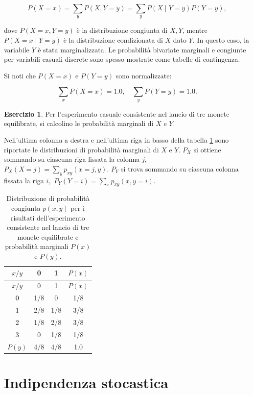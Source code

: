 \documentclass[
  11pt,
]{krantz}
\theoremstyle{definition}
\theoremstyle{definition}
\theoremstyle{definition}
\newtheorem{exercise}{Esercizio}[chapter]
\theoremstyle{definition}
\theoremstyle{remark}
\begin{document}
\begin{equation}
P(X = x) = \sum_y P(X, Y = y) = \sum_y P(X \mid Y = y) P(Y = y),
\end{equation}

dove \(P(X = x,Y = y)\) è la distribuzione congiunta di \(X, Y\), mentre \(P(X = x \mid Y = y)\) è la distribuzione condizionata di \(X\) dato \(Y\). In questo caso, la variabile \(Y\) è stata marginalizzata. Le probabilità bivariate marginali e congiunte per variabili casuali discrete sono spesso mostrate come tabelle di contingenza.

Si noti che \(P(X = x)\) e \(P(Y = y)\) sono normalizzate:

\[
\sum_x P(X=x) = 1.0, \quad \sum_y P(Y=y) = 1.0.
\]

\begin{exercise}

Per l'esperimento casuale consistente nel lancio di tre monete equilibrate, si calcolino le probabilità marginali di \(X\) e \(Y\).

Nell'ultima colonna a destra e nell'ultima riga in basso della tabella \ref{tab:ditr-cong-biv} sono riportate le distribuzioni di probabilità marginali di \(X\) e \(Y\). \(P_X\) si ottiene sommando su ciascuna riga fissata la colonna \(j\), \(P_X(X = j) = \sum_y p_{xy}(x = j, y)\). \(P_Y\) si trova sommando su ciascuna colonna fissata la riga \(i,\) \(P_Y (Y = i) = \sum_x p_{xy}(x, y = i)\).

\begin{longtable}[]{@{}cccc@{}}
\caption{\label{tab:ditr-cong-biv} Distribuzione di probabilità congiunta \(p(x,y)\) per i risultati dell'esperimento consistente nel lancio di tre monete equilibrate e probabilità marginali \(P(x)\) e \(P(y)\).}\tabularnewline
\toprule
\(x / y\) & 0 & 1 & \(P(x)\) \\
\midrule
\endfirsthead
\toprule
\(x / y\) & 0 & 1 & \(P(x)\) \\
\midrule
\endhead
0 & 1/8 & 0 & 1/8 \\
1 & 2/8 & 1/8 & 3/8 \\
2 & 1/8 & 2/8 & 3/8 \\
3 & 0 & 1/8 & 1/8 \\
\(P(y)\) & 4/8 & 4/8 & 1.0 \\
\bottomrule
\end{longtable}

\end{exercise}

\hypertarget{indipendenza-stocastica}{%
\section{Indipendenza stocastica}\label{indipendenza-stocastica}}
\end{document}
